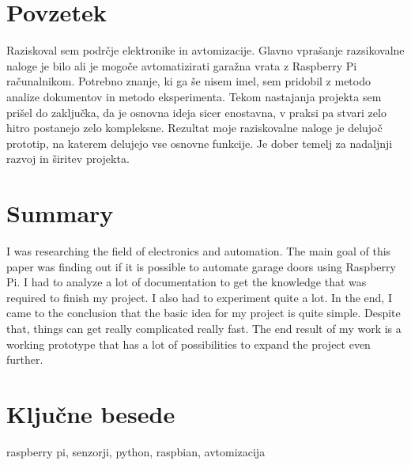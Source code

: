 \documentclass[11pt]{article}
\begin{document}
\newpage
\thispagestyle{empty}
\section*{Povzetek}
Raziskoval sem podrčje elektronike in avtomizacije. Glavno vprašanje razsikovalne naloge je bilo ali je mogoče avtomatizirati garažna vrata z Raspberry Pi računalnikom. Potrebno znanje, ki ga še nisem imel, sem pridobil z metodo analize dokumentov in metodo eksperimenta. Tekom nastajanja projekta sem prišel do zaključka, da je osnovna ideja sicer enostavna, v praksi pa stvari zelo hitro postanejo zelo kompleksne. Rezultat moje raziskovalne naloge je delujoč prototip, na katerem delujejo vse osnovne funkcije. Je dober temelj za nadaljnji razvoj in širitev projekta.
\section*{Summary}
I was researching the field of electronics and automation. The main goal of this paper was finding out if it is possible to automate garage doors using Raspberry Pi. I had to analyze a lot of documentation to get the knowledge that was required to finish my project. I also had to experiment quite a lot. In the end, I came to the conclusion that the basic idea for my project is quite simple. Despite that, things can get really complicated really fast. The end result of my work is a working prototype that has a lot of possibilities to expand the project even further.
\section*{Ključne besede}
raspberry pi, senzorji, python, raspbian, avtomizacija

\printglossary[type=\acronymtype,title={Kratice}]

\renewcommand{\baselinestretch}{0.90}\normalsize
\newpage
{}
\thispagestyle{empty}
\tableofcontents
\newpage
\listoffigures
\renewcommand{\baselinestretch}{1.0}\normalsize
\newpage

\pagestyle{fancy}
\fancyhead{}
\fancyfoot{}
\fancyfoot[C]{\thepage}
\end{document}
